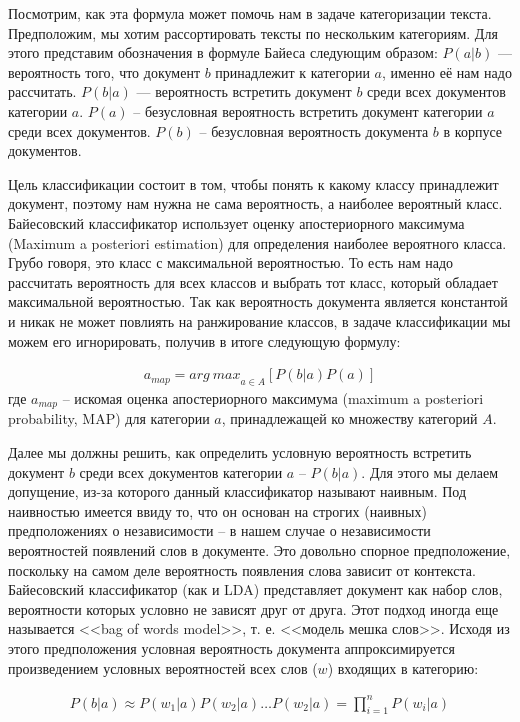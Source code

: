 Посмотрим, как эта формула может помочь нам в задаче категоризации текста. Предположим, мы хотим рассортировать тексты по нескольким категориям. Для этого представим обозначения в формуле Байеса следующим образом:  $P(a|b)$ --- вероятность того, что документ $b$ принадлежит к категории $a$, именно её нам надо рассчитать. $P(b|a)$ --- вероятность встретить документ $b$ среди всех документов категории $a$. $P(a)$ -- безусловная вероятность встретить документ категории $a$ среди всех документов. $P(b)$ -- безусловная вероятность документа $b$ в корпусе документов.

Цель классификации состоит в том, чтобы понять к какому классу принадлежит документ, поэтому нам нужна не сама вероятность, а наиболее вероятный класс. Байесовский классификатор использует оценку апостериорного максимума (Maximum a posteriori estimation) для определения наиболее вероятного класса. Грубо говоря, это класс с максимальной вероятностью. То есть нам надо рассчитать вероятность для всех классов и выбрать тот класс, который обладает максимальной вероятностью. Так как вероятность документа является константой и никак не может повлиять на ранжирование классов, в задаче классификации мы можем его игнорировать, получив в итоге следующую формулу:

\begin{eqnarray}\label{eq:map}
a_{map}={arg\ max}_{a\in A} [P(b|a)P(a)]
\end{eqnarray}
где $a_{map}$ -- искомая оценка апостериорного максимума (maximum a posteriori probability, MAP) для категории $a$, принадлежащей ко множеству категорий $A$.

Далее мы должны решить, как определить условную вероятность встретить документ $b$ среди всех документов категории $a$ -- $P(b|a)$. Для этого мы делаем допущение, из-за которого данный классификатор называют наивным. Под наивностью имеется ввиду то, что он основан на строгих (наивных) предположениях о независимости -- в нашем случае о независимости вероятностей появлений слов в документе. Это довольно спорное предположение, поскольку на самом деле вероятность появления слова зависит от контекста. Байесовский классификатор (как и LDA) представляет документ как набор слов, вероятности которых условно не зависят друг от друга. Этот подход иногда еще называется <<bag of words model>>, т. е. <<модель мешка слов>>. Исходя из этого предположения условная вероятность документа аппроксимируется произведением условных вероятностей всех слов ($w$) входящих в категорию:

\begin{eqnarray}
P(b|a) \approx P(w_1|a) P(w_2|a)\ldots P(w_2|a) = \prod_{i=1}^nP(w_i|a)
\end{eqnarray}

